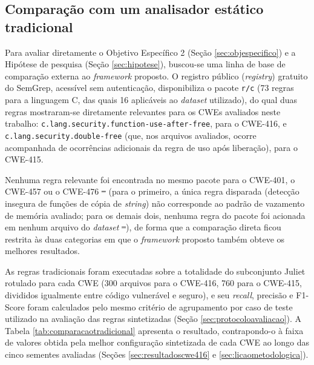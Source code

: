 \documentclass[
    12pt,                %
    openright,           %
    oneside,             %
    a4paper,             %
    english,             %
    brazil               %
]{abntex2}
\newcommand{\antigo}[1]{\sout{#1}}
\newcommand{\novo}[1]{{\color{red}#1}}
\begin{document}
\subsection{Comparação com um analisador estático tradicional}
\label{sec:comparacaotradicional}
\par
Para avaliar diretamente o Objetivo Específico 2 (Seção \ref{sec:objespecifico}) e a Hipótese de pesquisa (Seção \ref{sec:hipotese}), buscou-se uma linha de base de comparação externa ao \textit{framework} proposto.
O registro público (\textit{registry}) gratuito do SemGrep, acessível sem autenticação, disponibiliza o pacote \texttt{r/c} (73 regras para a linguagem C, das quais 16 aplicáveis ao \textit{dataset} utilizado), do qual duas regras mostraram-se diretamente relevantes para os CWEs avaliados neste trabalho: \texttt{c.lang.security.function-use-after-free}, para o CWE-416, e \texttt{c.lang.security.double-free} (que, nos arquivos avaliados, ocorre acompanhada de ocorrências adicionais da regra de uso após liberação), para o CWE-415.
\par
Nenhuma regra relevante foi encontrada no mesmo pacote para o CWE-401, o CWE-457 ou o CWE-476\antigo{ --}\novo{ (}para o primeiro, a única regra disparada (detecção insegura de funções de cópia de \textit{string}) não corresponde ao padrão de vazamento de memória avaliado; para os demais dois, nenhuma regra do pacote foi acionada em nenhum arquivo do \textit{dataset}\antigo{ --}\novo{)}, de forma que a comparação direta ficou restrita às duas categorias em que o \textit{framework} proposto também obteve os melhores resultados.
\par
As regras tradicionais foram executadas sobre a totalidade do subconjunto Juliet rotulado para cada CWE (300 arquivos para o CWE-416, 760 para o CWE-415, divididos igualmente entre código vulnerável e seguro), e seu \textit{recall}, precisão e F1-Score foram calculados pelo mesmo critério de agrupamento por caso de teste utilizado na avaliação das regras sintetizadas (Seção \ref{sec:protocoloavaliacao}).
A Tabela \ref{tab:comparacaotradicional} apresenta o resultado, contrapondo-o à faixa de valores obtida pela melhor configuração sintetizada de cada CWE ao longo das cinco sementes avaliadas (Seções \ref{sec:resultadoscwe416} e \ref{sec:licaometodologica}).
\end{document}
